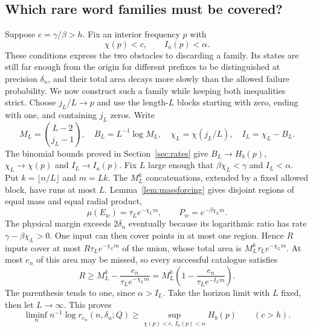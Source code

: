 \documentclass[11pt]{amsart}
\theoremstyle{definition}
\theoremstyle{remark}
\numberwithin{equation}{section}
\begin{document}
\subsection{Which rare word families must be covered?}
Suppose $c=\gamma/\beta>h$. Fix an interior frequency $p$ with
\begin{equation}\label{eq:strictprobtype}
\chi(p)<c,\qquad I_a(p)<\alpha.
\end{equation}
These conditions express the two obstacles to discarding a family.
Its states are still far enough from the origin for different
prefixes to be distinguished at precision $\delta_n$, and their
total area decays more slowly than the allowed failure probability.
We now construct such a family while keeping both inequalities
strict.
Choose $j_L/L\to p$ and use the length-$L$ blocks starting with
zero, ending with one, and containing $j_L$ zeros. Write
\[
M_L=\binom{L-2}{j_L-1},\quad B_L=L^{-1}\log M_L,
\quad\chi_L=\chi(j_L/L),\quad I_L=\chi_L-B_L.
\]
The binomial bounds proved in Section~\ref{sec:rates} give
$B_L\to H_b(p)$, $\chi_L\to\chi(p)$ and $I_L\to I_a(p)$.
Fix $L$ large enough that $\beta\chi_L<\gamma$ and $I_L<\alpha$.
Put $k=\lfloor n/L\rfloor$ and $m=Lk$.
The $M_L^k$ concatenations, extended by a fixed allowed block,
have runs at most $L$. Lemma~\ref{lem:massforcing} gives disjoint
regions of equal mass and equal radial product,
\[
\mu(E_w)=\tau_Le^{-\chi_Lm},\qquad P_w=e^{-\beta\chi_Lm}.
\]
The physical margin exceeds $2\delta_n$ eventually because its
logarithmic ratio has rate $\gamma-\beta\chi_L>0$.
One input can then cover points in at most one region. Hence $R$
inputs cover at most $R\tau_Le^{-\chi_Lm}$ of the union, whose
total area is $M_L^k\tau_Le^{-\chi_Lm}$. At most $e_n$ of this
area may be missed, so every successful catalogue satisfies
\begin{equation}\label{eq:rarecount}
R\ge M_L^k-\frac{e_n}{\tau_Le^{-\chi_Lm}}
 =M_L^k\left(1-\frac{e_n}{\tau_Le^{-I_Lm}}\right).
\end{equation}
The parenthesis tends to one, since $\alpha>I_L$.
Take the horizon limit with $L$ fixed, then let $L\to\infty$.
This proves
\begin{equation}\label{eq:strictlower}
\liminf_n n^{-1}\log r_{e_n}(n,\delta_n;Q)
 \ge\sup_{\chi(p)<c,\ I_a(p)<\alpha}H_b(p)\qquad(c>h).
\end{equation}
\end{document}
